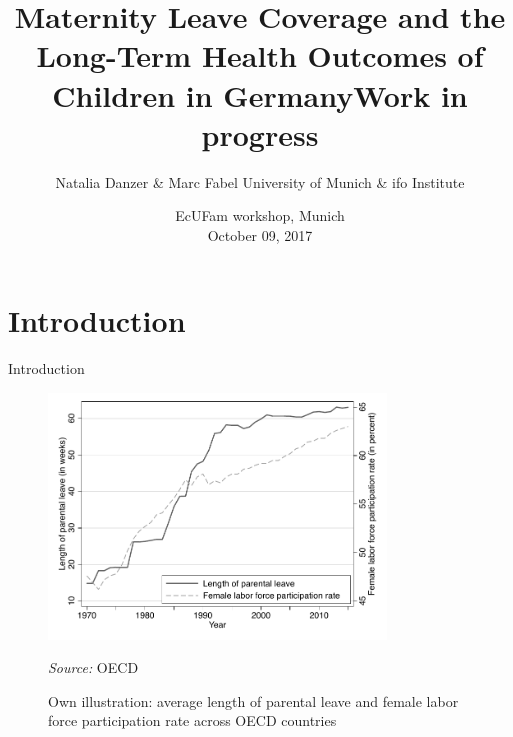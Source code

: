 \documentclass{beamer} %
\title[Maternity leave and long-run child health]{  \textbf{Maternity Leave Coverage and the Long-Term Health Outcomes of Children in Germany}\newline Work in progress}
\author[Danzer \& Fabel]{Natalia Danzer \& Marc Fabel \newline University of Munich \& ifo Institute}
\date{EcUFam workshop, Munich\\October 09, 2017}
\begin{document}
\begin{frame}
	\titlepage
\end{frame}





\section{Introduction}
\begin{frame}{Introduction}

\begin{figure}\centering
\includegraphics[width=0.8\textwidth]{../../analysis/graphs/SOEP/PL_OECD.pdf}
\caption{Own illustration: average length of parental leave and female labor force participation rate across OECD countries}\vspace{-0.3cm}
\begin{minipage}{\textwidth} %
{\footnotesize \textit{Source: }OECD}
\end{minipage}
\end{figure}

\end{frame}
\end{document}
